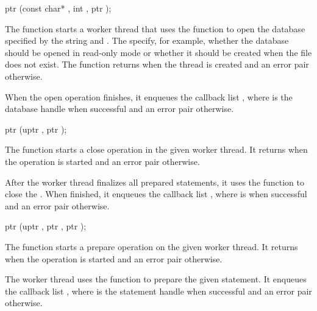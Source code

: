 \begin{function}
  ptr (const char* , int , ptr );
\end{function}

The  function starts a worker thread that
uses the  function to open the database
specified by the  string and . The
 specify, for example, whether the database should be
opened in read-only mode or whether it should be created when the file
does not exist. The function returns  when the thread is
created and an error pair otherwise.

When the open operation finishes, it enqueues the callback list
, where  is the
database handle when successful and an error pair otherwise.

\begin{function}
  ptr (uptr , ptr );
\end{function}

The  function starts a close operation in
the given  worker thread. It returns  when the
operation is started and an error pair otherwise.

After the worker thread finalizes all prepared statements, it uses the
 function to close the . When
finished, it enqueues the callback list , where  is  when successful and
an error pair otherwise.

\begin{function}
  ptr (uptr , ptr , ptr );
\end{function}

The  function starts a prepare operation
on the given  worker thread. It returns  when
the operation is started and an error pair otherwise.

The worker thread uses the  function to
prepare the given  statement. It enqueues the callback list
, where  is the
statement handle when successful and an error pair otherwise.

